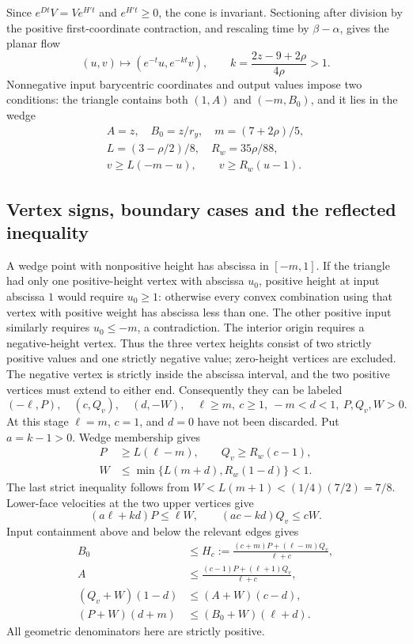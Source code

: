 Since $e^{Dt}V=Ve^{H't}$ and $e^{H't}\ge0$, the cone is invariant.
Sectioning after division by the positive first-coordinate contraction,
and rescaling time by $\beta-\alpha$, gives the planar flow
\begin{equation}
 (u,v)\longmapsto(e^{-t}u,e^{-kt}v),\qquad
 k=\frac{2z-9+2\rho}{4\rho}>1.\label{eq:flow}
\end{equation}
Nonnegative input barycentric coordinates and output values impose two
conditions: the triangle contains both $(1,A)$ and $(-m,B_0)$, and it lies
in the wedge
\begin{gather}
 A=z,\quad B_0=z/r_y,\quad m=(7+2\rho)/5,\\
 L=(3-\rho/2)/8,\quad R_w=35\rho/88,\\
 v\ge L(-m-u),\qquad v\ge R_w(u-1).\label{eq:wedge}
\end{gather}

\subsection{Vertex signs, boundary cases and the reflected inequality}
A wedge point with nonpositive height has abscissa in $[-m,1]$.
If the triangle had only one positive-height vertex with abscissa $u_0$,
positive height at input abscissa $1$ would require $u_0\ge1$: otherwise
every convex combination using that vertex with positive weight has
abscissa less than one. The other positive input similarly requires
$u_0\le-m$, a contradiction. The interior origin requires a
negative-height vertex. Thus the three vertex heights consist of two
strictly positive values and one strictly negative value; zero-height
vertices are excluded. The negative vertex is strictly inside the
abscissa interval, and the two positive vertices must extend to either
end. Consequently they can be labeled
\begin{equation}
 (-\ell,P),\quad(c,Q_v),\quad(d,-W),\quad
 \ell\ge m,\ c\ge1,\ -m<d<1,\ P,Q_v,W>0.\label{eq:vertices}
\end{equation}
At this stage $\ell=m$, $c=1$, and $d=0$ have not been discarded.
Put $a=k-1>0$. Wedge membership gives
\begin{align}
 P&\ge L(\ell-m),\qquad Q_v\ge R_w(c-1),\nonumber\\
 W&\le\min\{L(m+d),R_w(1-d)\}<1.\label{eq:ineq1}
\end{align}
The last strict inequality follows from
$W<L(m+1)<(1/4)(7/2)=7/8$. Lower-face velocities at the two upper
vertices give
\begin{equation}
 (a\ell+kd)P\le\ell W,\qquad
 (ac-kd)Q_v\le cW.\label{eq:ineq2}
\end{equation}
Input containment above and below the relevant edges gives
\begin{align}
 B_0&\le H_c:=\frac{(c+m)P+(\ell-m)Q_v}{\ell+c},\label{eq:height}\\
 A&\le\frac{(c-1)P+(\ell+1)Q_v}{\ell+c},\label{eq:upperA}\\
 (Q_v+W)(1-d)&\le(A+W)(c-d),\label{eq:lowerA}\\
 (P+W)(d+m)&\le(B_0+W)(\ell+d).\label{eq:lowerB}
\end{align}
All geometric denominators here are strictly positive.

